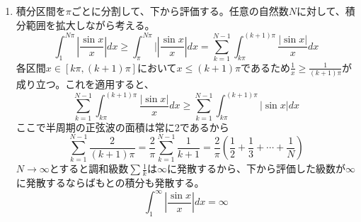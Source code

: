 \begin{souanswer}
\begin{enumerate}
\begin{equation*}
	\left|\int_a^\infty \frac{\sin{x}}{x}dx\right|\le \left|-\int_1^\infty \frac{\cos{x}}{x^2}dx\right|+ |\cos{1}|
\end{equation*}
	の結果より$\left|\int_1^\infty \frac{\cos{x}}{x}dx\right|\le 1$であり、$\cos{1}$は有限の値であるから
\begin{equation*}
	\left|\int_1^\infty \frac{\sin{x}}{x}dx\right|\le 1+ |\cos{x}|< \infty
\end{equation*}
	\item 積分区間を$\pi$ごとに分割して、下から評価する。任意の自然数$N$に対して、積分範囲を拡大しながら考える。
\begin{equation*}
	\int_1^{N\pi} \left|\frac{\sin{x}}{x}\right|dx\ge \int_\pi^{N\pi}|\left|\frac{\sin{x}}{x}\right|dx= \sum_{k= 1}^{N- 1}\int_{k\pi}^{(k+ 1)\pi} \frac{|\sin{x}|}{x}dx
\end{equation*}
	各区間$x\in [k\pi, (k+ 1)\pi]$において$x\le (k+ 1)\pi$であるため$\frac{1}{x}\ge \frac{1}{(k+ 1)\pi}$が成り立つ。これを適用すると、
\begin{equation*}
	\sum_{k= 1}^{N- 1}\int_{k\pi}^{(k+ 1)\pi}\frac{|\sin{x}|}{x}dx\ge \sum_{k= 1}^{N- 1} \int_{k\pi}^{(k+ 1)\pi}|\sin{x}|dx
\end{equation*}
	ここで半周期の正弦波の面積は常に2であるから
\begin{equation*}
	\sum_{k= 1}^{N- 1}\frac{2}{(k+ 1)\pi}= \frac{2}{\pi}\sum_{k= 1}^{N- 1} \frac{1}{k+ 1}= \frac{2}{\pi}\left(\frac{1}{2}+ \frac{1}{3}+ \cdots+ \frac{1}{N}\right)
\end{equation*}
	$N\to \infty$とすると調和級数$\sum \frac{1}{k}$は$\infty$に発散するから、下から評価した級数が$\infty$に発散するならばもとの積分も発散する。
\begin{equation*}
	\int_1^\infty \left|\frac{\sin{x}}{x}\right|dx= \infty
\end{equation*}
\end{enumerate}
\end{souanswer}